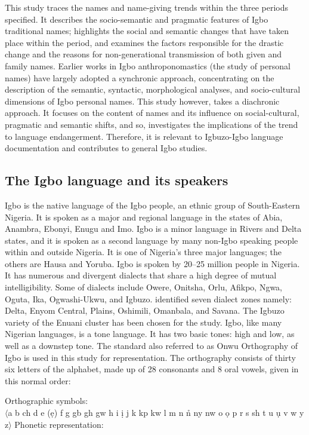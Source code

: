 \documentclass[output=paper]{langscibook}
\begin{document}
This study traces the names and name-giving trends within the three periods specified. It describes the socio-semantic and pragmatic features of Igbo traditional names; highlights the social and semantic changes that have taken place within the period, and examines the factors responsible for the drastic change and the reasons for non-generational transmission of both given and family names. Earlier works in Igbo anthroponomastics (the study of personal names) have largely adopted a synchronic approach, concentrating on the description of the semantic, syntactic, morphological analyses, and socio-cultural dimensions of Igbo personal names. This study however, takes a diachronic approach. It focuses on the content of names and its influence on social-cultural, pragmatic and semantic shifts, and so, investigates the implications of the trend to language endangerment. Therefore, it is relevant to Igbuzo-Igbo language documentation and contributes to general Igbo studies. 

\subsection{The Igbo language and its speakers}

Igbo is the native language of the Igbo people, an ethnic group of South-Eastern Nigeria. It is spoken as a major and regional language in the states of Abia, Anambra, Ebonyi, Enugu and Imo. Igbo is a minor language in Rivers and Delta states, and it is spoken as a second language by many non-Igbo speaking people within and outside Nigeria. It is one of Nigeria’s three major languages; the others are Hausa and Yoruba. Igbo is spoken by 20--25 million people in Nigeria. It has numerous and divergent dialects that share a high degree of mutual intelligibility. Some of dialects include Owere, Onitsha, Orlu, Afikpo, Ngwa, Oguta, Ika, Ogwashi-Ukwu, and Igbuzo. \citet{Manfredi1989} identified seven dialect zones namely: Delta, Enyom Central, Plains, Oshimili, Omanbala, and Savana. The Igbuzo variety of the Enuani cluster has been chosen for the study. Igbo, like many Nigerian languages, is a tone language. It has two basic tones: high and low, as well as a downstep tone. The standard also referred to as Onwu Orthography of Igbo is used in this study for representation. The orthography consists of thirty six letters of the alphabet, made up of 28 consonants and 8 oral vowels, given in this normal order:

\ea
\begin{xlist}
\ex Orthographic symbols:\\
{$\langle$}a b ch d e (ẹ) f g gb gh gw h i ị j k kp kw l m n n̊ ny nw o ọ p r s sh t u ụ  v w y z{$\rangle$}
\ex Phonetic representation:\\\relax
[a b tʃ d e (ɛ) f g ɓ ɣ gʷ h i ɪ dʒ k ƥ kʷ  l m n ŋ ɲ ŋʷ o ɔ p r s ∫ t u ʊ v w j z]
\end{xlist}
\z
\end{document}
